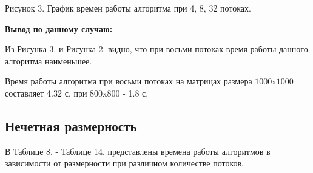 \documentclass[12pt]{report}
\begin{document}
		\begin{center}
			
			Рисунок 3. График времен работы алгоритма при 4, 8, 32 потоках.
		\end{center}
	\newpage
	\textbf{Вывод по данному случаю:}
	
	Из Рисунка 3. и Рисунка 2. видно, что при восьми потоках время работы данного алгоритма наименьшее.
	
	Время работы алгоритма при восьми потоках на матрицах размера $1000$x$1000$ составляет 4.32 с, при $800$x$800$ - 1.8 с.
	
	\subsection{Нечетная размерность}
	
	В Таблице 8. - Таблице 14. представлены времена работы алгоритмов в зависимости от размерности при различном количестве потоков.
	~\\
	
\end{document}
